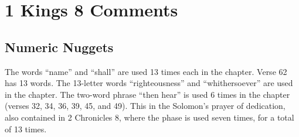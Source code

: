 \section{1 Kings 8 Comments}

\subsection{Numeric Nuggets}
The words ``name'' and ``shall'' are used 13 times each in the chapter. Verse 62 has 13 words. The 13-letter words ``righteousness'' and ``whithersoever'' are used in the chapter. The two-word phrase ``then hear'' is used 6 times in the chapter (verses 32, 34, 36, 39, 45, and 49). This in the Solomon's prayer of dedication, also contained in 2 Chronicles 8, where the phase is used seven times, for a total of 13 times.

